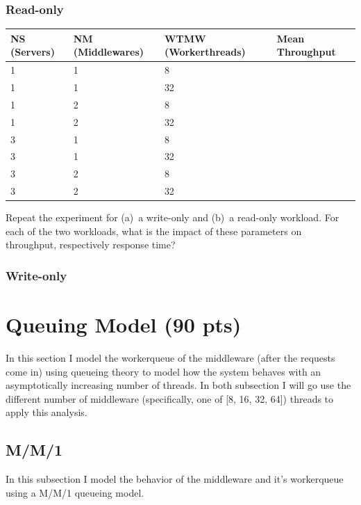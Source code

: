 \documentclass[11pt,a4paper]{article}
\begin{document}
\subsubsection{Read-only}


\begin{center}
    \begin{tabular}{ | l | l | l | p{5cm} |}
    \hline
    NS (Servers) & NM (Middlewares) & WTMW (Workerthreads) & Mean Throughput \\ \hline
    1 & 1 & 8 & \\ \hline
    1& 1 & 32 & \\ \hline
    1 & 2 & 8 &  \\ \hline
   	1 & 2 & 32 & \\ \hline
    3 & 1 & 8 & \\ \hline
    3 & 1 & 32 &  \\ \hline
    3 & 2 & 8 &  \\ \hline
    3 & 2 & 32 &  \\
    \hline
    \end{tabular}
\end{center}

Repeat the experiment for (a)~a write-only and (b)~a read-only workload.
For each of the two workloads, what is the impact of these parameters on throughput, respectively response time?




\subsubsection{Write-only}



\section{Queuing Model (90 pts)}

In this section I model the workerqueue of the middleware (after the requests come in) using queueing theory to model how the system behaves with an asymptotically increasing number of threads.
In both subsection I will go use the different number of middleware (specifically, one of [8, 16, 32, 64]) threads to apply this analysis.

\subsection{M/M/1}
In this subsection I model the behavior of the middleware and it's workerqueue using a M/M/1 queueing model. \\
\end{document}
